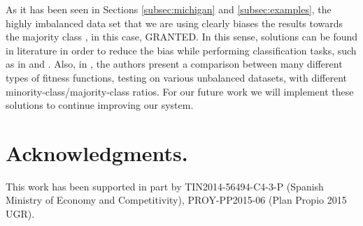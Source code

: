 \documentclass[a4paper,10pt,twocolumn,preprint,3p]{elsarticle}
\begin{document}

As it has been seen in Sections \ref{subsec:michigan} and \ref{subsec:examples}, the highly imbalanced data set that we are
using clearly biases the results towards the majority class 
\cite{japkowicz2002class}, in this case, GRANTED. In this sense,
solutions can be found in literature in order to reduce the bias while
performing classification tasks, such as in \cite{chawla2005data} and
\cite{sun2009classification}. Also, in \cite{bhowan2012developing},
the authors present a comparison between many different types of
fitness functions, testing on various unbalanced datasets, with
different minority-class/majority-class ratios. For our future work we
will implement these solutions to continue improving our system. 

\section*{Acknowledgments.}

This work has been supported in part by TIN2014-56494-C4-3-P (Spanish
Ministry of Economy and Competitivity), PROY-PP2015-06 (Plan Propio
2015 UGR). %



\end{document}

